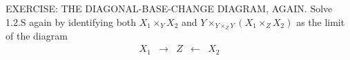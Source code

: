 EXERCISE: THE DIAGONAL-BASE-CHANGE DIAGRAM, AGAIN. Solve 1.2.S again by identifying both $X_1\times_Y X_2$ and $Y\times_{Y\times_Z Y}(X_1\times_Z X_2)$ as the limit of the diagram
$$\begin{array}{ccccc} X_1 &\longrightarrow& Z &\longleftarrow& X_2 \end{array}$$
